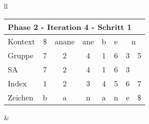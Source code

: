 \begin{table}[H]

\centering
\begin{adjustbox}{max width=\textwidth}
\begin{tabular}{ll}

\begin{tabular}{lccccccc}
\multicolumn{8}{l}{Phase 2 - Iteration 4 - Schritt 1}                                                                                                                                                             \\ \hline
\multicolumn{1}{l|}{Kontext} & \multicolumn{1}{c|}{\$} & \multicolumn{1}{c|}{anane} & \multicolumn{1}{c|}{ane} & \multicolumn{1}{c|}{\cellcolor[HTML]{\green}b} & \multicolumn{1}{c|}{e} & \multicolumn{2}{c}{n} \\
\multicolumn{1}{l|}{Gruppe}  & \multicolumn{1}{c|}{7}  & \multicolumn{1}{c|}{2}     & \multicolumn{1}{c|}{4}   & \multicolumn{1}{c|}{\cellcolor[HTML]{\green}1} & \multicolumn{1}{c|}{6} & 3         & 5          \\ 
\multicolumn{1}{l|}{SA}      & \multicolumn{1}{c|}{7}  & \multicolumn{1}{c|}{2}     & \multicolumn{1}{c|}{4}   & \multicolumn{1}{c|}{\cellcolor[HTML]{\green}1} & \multicolumn{1}{c|}{6} & 3         &            \\ \hline
\multicolumn{1}{l|}{Index}   & 1                       & 2                          & 3                        & 4                                              & 5                      & 6         & 7          \\
\multicolumn{1}{l|}{Zeichen} & b                       & a                          & n                        & a                                              & n                      & e         & \$        
\end{tabular}
&


\end{tabular}
\end{adjustbox}
\end{table}
